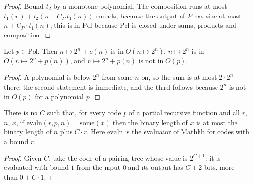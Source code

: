 \begin{proof}
  \leanok
  Bound $t_2$ by a monotone polynomial. The composition runs at most $t_1(n) + t_2(n + C_P\, t_1(n))$ rounds,
  because the output of $P$ has size at most $n + C_P \cdot t_1(n)$; this is in $\mathrm{Pol}$ because
  $\mathrm{Pol}$ is closed under sums, products and composition.
\end{proof}

\begin{theorem}
  \label{thm:machines-absorbs}
  \leanok
  Let $p \in \mathrm{Pol}$. Then $n \mapsto 2^n + p(n)$ is in $O(n \mapsto 2^n)$, $n \mapsto 2^n$ is in
  $O(n \mapsto 2^n + p(n))$, and $n \mapsto 2^n + p(n)$ is not in $O(p)$.
  \own{}
\end{theorem}

\begin{proof}
  \leanok
  A polynomial is below $2^n$ from some $n$ on, so the sum is at most $2 \cdot 2^n$ there; the second
  statement is immediate, and the third follows because $2^n$ is not in $O(p)$ for a polynomial $p$.
\end{proof}

\begin{theorem}
  \label{thm:machines-evaln}
  \leanok
  There is no $C$ such that, for every code $p$ of a partial recursive function and all $r$, $n$, $x$, if
  $\mathrm{evaln}(r, p, n) = \mathrm{some}(x)$ then the binary length of $x$ is at most the binary length of
  $n$ plus $C \cdot r$. Here $\mathrm{evaln}$ is the evaluator of Mathlib for codes with a bound $r$.
  \own{}
\end{theorem}

\begin{proof}
  \leanok
  Given $C$, take the code of a pairing tree whose value is $2^{C+1}$: it is evaluated with bound $1$ from
  the input $0$ and its output has $C + 2$ bits, more than $0 + C \cdot 1$.
\end{proof}
